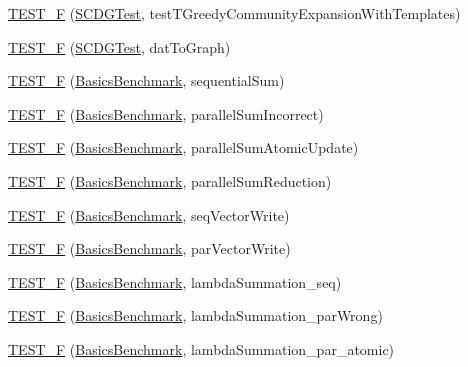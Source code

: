\begin{DoxyCompactItemize}
\item 
\hyperlink{namespace_networ_kit_a26d85a1f1897897b6548ee4b93d63432}{T\-E\-S\-T\-\_\-\-F} (\hyperlink{class_networ_kit_1_1_s_c_d_g_test}{S\-C\-D\-G\-Test}, test\-T\-Greedy\-Community\-Expansion\-With\-Templates)
\item 
\hyperlink{namespace_networ_kit_aa8c7925db84e0577157de0e4f2614515}{T\-E\-S\-T\-\_\-\-F} (\hyperlink{class_networ_kit_1_1_s_c_d_g_test}{S\-C\-D\-G\-Test}, dat\-To\-Graph)
\item 
\hyperlink{namespace_networ_kit_af04baad3988791b80bd77d2a8e1f3fde}{T\-E\-S\-T\-\_\-\-F} (\hyperlink{class_networ_kit_1_1_basics_benchmark}{Basics\-Benchmark}, sequential\-Sum)
\item 
\hyperlink{namespace_networ_kit_a12fc6da36d3dd1153a231e29b89ff862}{T\-E\-S\-T\-\_\-\-F} (\hyperlink{class_networ_kit_1_1_basics_benchmark}{Basics\-Benchmark}, parallel\-Sum\-Incorrect)
\item 
\hyperlink{namespace_networ_kit_afc036b6f174e2b06a52aca2d4b10d7de}{T\-E\-S\-T\-\_\-\-F} (\hyperlink{class_networ_kit_1_1_basics_benchmark}{Basics\-Benchmark}, parallel\-Sum\-Atomic\-Update)
\item 
\hyperlink{namespace_networ_kit_a95bf11f85605236d2f128edede2cfbd2}{T\-E\-S\-T\-\_\-\-F} (\hyperlink{class_networ_kit_1_1_basics_benchmark}{Basics\-Benchmark}, parallel\-Sum\-Reduction)
\item 
\hyperlink{namespace_networ_kit_a5b680dda57b4da22f8475528748fb4ca}{T\-E\-S\-T\-\_\-\-F} (\hyperlink{class_networ_kit_1_1_basics_benchmark}{Basics\-Benchmark}, seq\-Vector\-Write)
\item 
\hyperlink{namespace_networ_kit_afd8f5eb0c62ed8ed2b6783f0304c15b0}{T\-E\-S\-T\-\_\-\-F} (\hyperlink{class_networ_kit_1_1_basics_benchmark}{Basics\-Benchmark}, par\-Vector\-Write)
\item 
\hyperlink{namespace_networ_kit_aafb7e9dd6a69e2661b9c2df98572b6ce}{T\-E\-S\-T\-\_\-\-F} (\hyperlink{class_networ_kit_1_1_basics_benchmark}{Basics\-Benchmark}, lambda\-Summation\-\_\-seq)
\item 
\hyperlink{namespace_networ_kit_a1fe9a0794fb8a53a6ca8da14bac83b7b}{T\-E\-S\-T\-\_\-\-F} (\hyperlink{class_networ_kit_1_1_basics_benchmark}{Basics\-Benchmark}, lambda\-Summation\-\_\-par\-Wrong)
\item 
\hyperlink{namespace_networ_kit_a19992a5d9a24ed5a5b7d71b6de317b3b}{T\-E\-S\-T\-\_\-\-F} (\hyperlink{class_networ_kit_1_1_basics_benchmark}{Basics\-Benchmark}, lambda\-Summation\-\_\-par\-\_\-atomic)
\item 

\end{DoxyCompactItemize}
